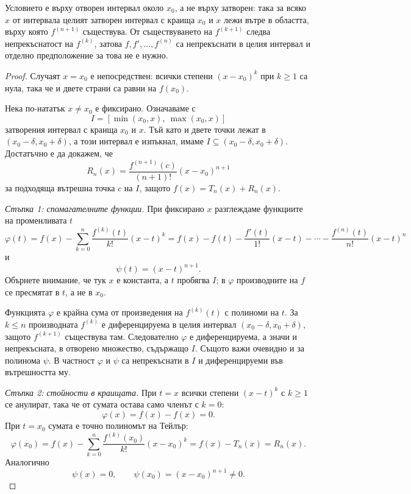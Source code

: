 Условието е върху отворен интервал около $x_0$, а не върху затворен: така за всяко $x$ от интервала целият затворен интервал с краища $x_0$ и $x$ лежи вътре в областта, върху която $f^{(n+1)}$ съществува. От съществуването на $f^{(k+1)}$ следва непрекъснатост на $f^{(k)}$, затова $f,f',\ldots,f^{(n)}$ са непрекъснати в целия интервал и отделно предположение за това не е нужно.

\begin{proof}
Случаят $x=x_0$ е непосредствен: всички степени $(x-x_0)^k$ при $k\geq 1$ са нула, така че и двете страни са равни на $f(x_0)$.

Нека по-нататък $x\ne x_0$ е фиксирано. Означаваме с
\[
I=[\min(x_0,x),\ \max(x_0,x)]
\]
затворения интервал с краища $x_0$ и $x$. Тъй като и двете точки лежат в $(x_0-\delta,x_0+\delta)$, а този интервал е изпъкнал, имаме $I\subseteq(x_0-\delta,x_0+\delta)$. Достатъчно е да докажем, че
\[
R_n(x)=\frac{f^{(n+1)}(c)}{(n+1)!}(x-x_0)^{n+1}
\]
за подходяща вътрешна точка $c$ на $I$, защото $f(x)=T_n(x)+R_n(x)$.

\emph{Стъпка 1: спомагателните функции.} При фиксирано $x$ разглеждаме функциите на променливата $t$
\[
\varphi(t)
=
f(x)-\sum_{k=0}^{n}\frac{f^{(k)}(t)}{k!}(x-t)^k
=
f(x)-f(t)-\frac{f'(t)}{1!}(x-t)-\cdots-\frac{f^{(n)}(t)}{n!}(x-t)^n
\]
и
\[
\psi(t)=(x-t)^{n+1}.
\]
Обърнете внимание, че тук $x$ е константа, а $t$ пробягва $I$; в $\varphi$ производните на $f$ се пресмятат в $t$, а не в $x_0$.

Функцията $\varphi$ е крайна сума от произведения на $f^{(k)}(t)$ с полиноми на $t$. За $k\leq n$ производната $f^{(k)}$ е диференцируема в целия интервал $(x_0-\delta,x_0+\delta)$, защото $f^{(k+1)}$ съществува там. Следователно $\varphi$ е диференцируема, а значи и непрекъсната, в отворено множество, съдържащо $I$. Същото важи очевидно и за полинома $\psi$. В частност $\varphi$ и $\psi$ са непрекъснати в $I$ и диференцируеми във вътрешността му.

\emph{Стъпка 2: стойности в краищата.} При $t=x$ всички степени $(x-t)^k$ с $k\geq 1$ се анулират, така че от сумата остава само членът с $k=0$:
\[
\varphi(x)=f(x)-f(x)=0.
\]
При $t=x_0$ сумата е точно полиномът на Тейлър:
\[
\varphi(x_0)
=
f(x)-\sum_{k=0}^{n}\frac{f^{(k)}(x_0)}{k!}(x-x_0)^k
=
f(x)-T_n(x)
=
R_n(x).
\]
Аналогично
\[
\psi(x)=0,
\qquad
\psi(x_0)=(x-x_0)^{n+1}\ne 0.
\]


\end{proof}

